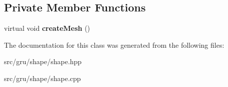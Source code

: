 \subsection*{\-Private \-Member \-Functions}
\begin{DoxyCompactItemize}
\item 
\hypertarget{classglutpp_1_1shape_1_1Box_1_1Box_a9e8dc10129b3ff4500b56c849d022044}{virtual void {\bfseries create\-Mesh} ()}\label{classglutpp_1_1shape_1_1Box_1_1Box_a9e8dc10129b3ff4500b56c849d022044}

\end{DoxyCompactItemize}


\-The documentation for this class was generated from the following files\-:\begin{DoxyCompactItemize}
\item 
src/gru/shape/shape.\-hpp\item 
src/gru/shape/shape.\-cpp\end{DoxyCompactItemize}
